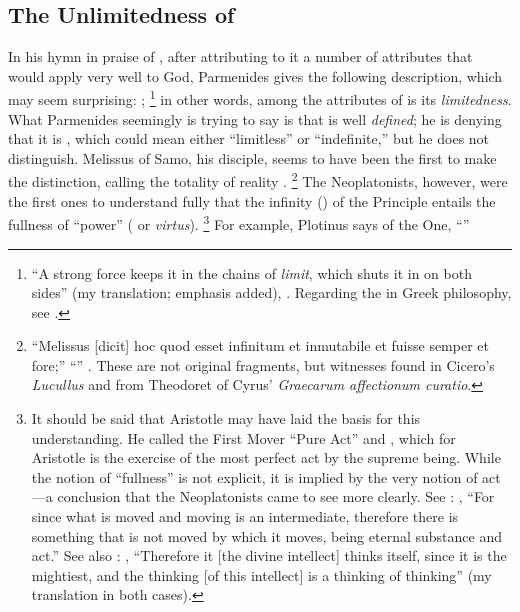 \subsection{The Unlimitedness of }

In his hymn in praise of , after attributing to it a number of attributes that would apply very well to God, Parmenides gives the following description, which may seem surprising: ;%
%
\footnote{``A strong force keeps it in the chains of \emph{limit}, which shuts it in on both sides'' (my translation; emphasis added), \cite[DK28b8, l.~30]{dk}. Regarding the  in Greek philosophy, see \cite[42--49]{definance:etre-et-agir}.} in other words, among the attributes of  is its \emph{limitedness}. What Parmenides seemingly is trying to say is that  is well \emph{defined}; he is denying that it is , which could mean either ``limitless'' or ``indefinite,'' but he does not distinguish. Melissus of Samo, his disciple, seems to have been the first to make the distinction, calling the totality of reality .%
%
\footnote{``Melissus [dicit] hoc quod esset infinitum et inmutabile et fuisse semper et fore;'' ``'' \parencite[DK30a8]{dk}. These are not original fragments, but witnesses found in Cicero's \emph{Lucullus} and from Theodoret of Cyrus' \emph{Graecarum affectionum curatio}.} The Neoplatonists, however, were the first ones to understand fully that the infinity () of the Principle entails the fullness of ``power'' ( or \emph{virtus}).%
%
\footnote{It should be said that Aristotle may have laid the basis for this understanding. He called the First Mover ``Pure Act'' and , which for Aristotle is the exercise of the most perfect act by the supreme being. While the notion of ``fullness'' is not explicit, it is implied by the very notion of act---a conclusion that the Neoplatonists came to see more clearly. See \cite[,~7, 1072a24--25]{aristotle:metaphysics}: , ``For since what is moved and moving is an intermediate, therefore there is something that is not moved by which it moves, being eternal substance and act.'' See also \cite[,~9, 1074b34]{aristotle:metaphysics}: , ``Therefore it [the divine intellect] thinks itself, since it is the mightiest, and the thinking [of this intellect] is a thinking of thinking'' (my translation in both cases).} For example, Plotinus says of the One, ``''\,%
